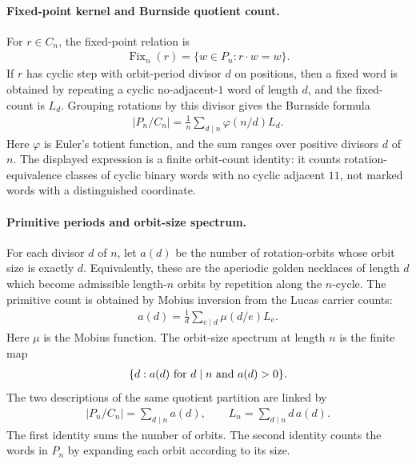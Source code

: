 \paragraph{Fixed-point kernel and Burnside quotient count.}
For $r\in C_n$, the fixed-point relation is
$$
\begin{aligned}
\operatorname{Fix}_n(r)=\{w\in P_n:r\cdot w=w\}.
\end{aligned}
$$
If $r$ has cyclic step with orbit-period divisor $d$ on positions, then a fixed word is obtained by repeating a cyclic no-adjacent-$1$ word of length $d$, and the fixed-count is $L_d$. Grouping rotations by this divisor gives the Burnside formula
$$
\begin{aligned}
|P_n/C_n|=\frac{1}{n}\sum_{d\mid n}\varphi(n/d)L_d.
\end{aligned}
$$
Here $\varphi$ is Euler's totient function, and the sum ranges over positive divisors $d$ of $n$. The displayed expression is a finite orbit-count identity: it counts rotation-equivalence classes of cyclic binary words with no cyclic adjacent $11$, not marked words with a distinguished coordinate.

\paragraph{Primitive periods and orbit-size spectrum.}
For each divisor $d$ of $n$, let $a(d)$ be the number of rotation-orbits whose orbit size is exactly $d$. Equivalently, these are the aperiodic golden necklaces of length $d$ which become admissible length-$n$ orbits by repetition along the $n$-cycle. The primitive count is obtained by Mobius inversion from the Lucas carrier counts:
$$
\begin{aligned}
a(d)=\frac{1}{d}\sum_{e\mid d}\mu(d/e)L_e.
\end{aligned}
$$
Here $\mu$ is the Mobius function. The orbit-size spectrum at length $n$ is the finite map
$$
\begin{aligned}
\{d:a(d)\hbox{ for }d\mid n\hbox{ and }a(d)>0\}.
\end{aligned}
$$
The two descriptions of the same quotient partition are linked by
$$
\begin{aligned}
|P_n/C_n|=\sum_{d\mid n}a(d),\qquad L_n=\sum_{d\mid n}d\,a(d).
\end{aligned}
$$
The first identity sums the number of orbits. The second identity counts the words in $P_n$ by expanding each orbit according to its size.

